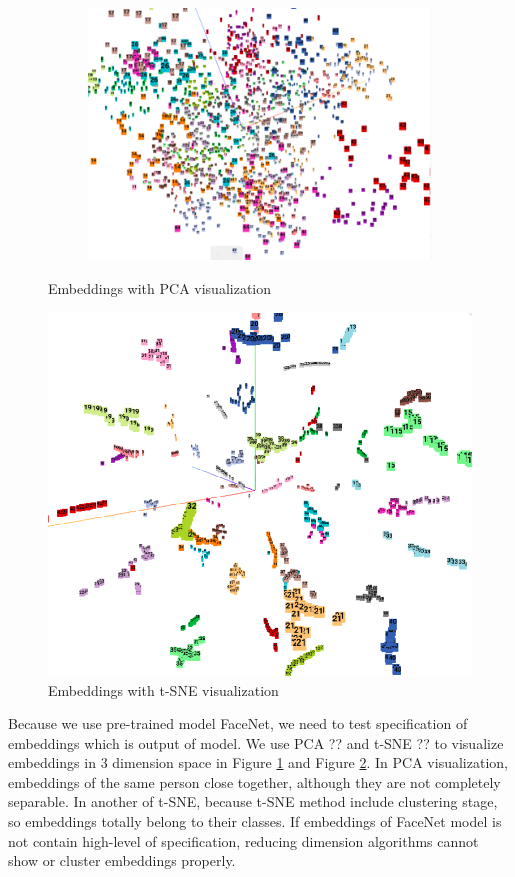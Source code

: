 \documentclass[journal, twocolumn]{IEEEtran}
\begin{document}
\begin{figure}[h!]
\begin{subfigure}[b]{0.5\linewidth}
    \caption{}
  \end{subfigure}
  \begin{subfigure}[b]{0.5\linewidth}
    \includegraphics[width=\linewidth]{img/pca3.png}
    \caption{}
  \end{subfigure}
  \caption{Embeddings with PCA visualization} 
  \label{fig:pca}
\end{figure}

\begin{figure}
    \centering
    \includegraphics[width=0.7\linewidth]{img/t-sne.png}
	\caption{Embeddings with t-SNE visualization}\label{fig:t-sne}
\end{figure}
Because we use pre-trained model FaceNet, we need to test specification of embeddings which is output of model. We use PCA ?? and t-SNE ?? to visualize embeddings in 3 dimension space in Figure \ref{fig:pca} and Figure \ref{fig:t-sne}. In PCA visualization, embeddings of the same person close together, although they are not completely separable. In another of t-SNE, because t-SNE method include clustering stage, so embeddings totally belong to their classes. If embeddings of FaceNet model is not contain high-level of specification, reducing dimension algorithms cannot show or cluster embeddings properly.  
\end{document}
